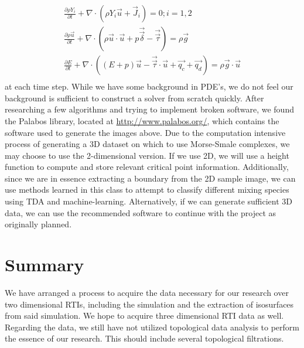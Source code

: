 \documentclass[12pt, fullpage,letterpaper]{article}
\begin{document}
	\begin{gather*}
		\frac{\partial \rho Y_i}{\partial t} + \nabla \cdot (\rho Y_i \vec{u} + \vec{J}_i) = 0; i = 1, 2 \\
		\frac{\partial \rho \vec{u}}{\partial t} + \nabla \cdot (\rho \vec{u} \cdot \vec{u} + p \vec{\vec{\delta}} - \vec{\vec{\tau}}) = \rho \vec{g} \\
		\frac{\partial E}{\partial t} + \nabla \cdot ((E + p)\vec{u} -\vec{\vec{\tau}}\cdot \vec{u} + \vec{q_c} + \vec{q_d} ) = \rho \vec{g} \cdot \vec{u} \\
	\end{gather*} 
	at each time step. While we have some background in PDE's, we do not feel our background is sufficient to construct a solver from scratch quickly. After researching a few algorithms and trying to implement broken software, we found the Palabos library, located at \url{http://www.palabos.org/}, which contains the software used to generate the images above. Due to the computation intensive process of generating a 3D dataset on which to use Morse-Smale complexes, we may choose to use the 2-dimensional version. If we use 2D, we will use a height function to compute and store relevant critical point information. Additionally, since we are in essence extracting a boundary from the 2D sample image, we can use methods learned in this class to attempt to classify different mixing species using TDA and machine-learning. Alternatively, if we can generate sufficient 3D data, we can use the recommended software to continue with the project as originally planned.
	
	 	\section*{\normalfont Summary}
	We have arranged a process to acquire the data necessary for our research over two dimensional RTIs, including the simulation and the extraction of isosurfaces from said simulation. We hope to acquire three dimensional RTI data as well. Regarding the data, we still have not utilized topological data analysis to perform the essence of our research. This should include several topological filtrations.
	
\end{document}

